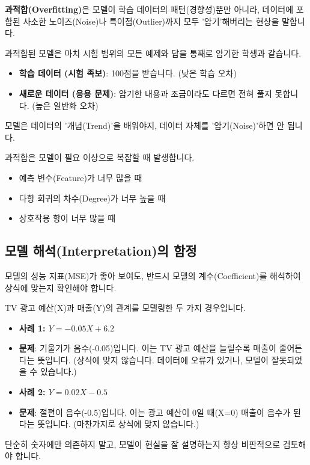 \documentclass[11pt,a4paper]{book}
\theoremstyle{definition}
\begin{document}
\textbf{과적합(Overfitting)}은 모델이 학습 데이터의 패턴(경향성)뿐만 아니라, 데이터에 포함된 사소한 노이즈(Noise)나 특이점(Outlier)까지 모두 '암기'해버리는 현상을 말합니다.

\begin{examplebox}[title=과적합 비유: 암기만 잘하는 학생]
과적합된 모델은 마치 시험 범위의 모든 예제와 답을 통째로 암기한 학생과 같습니다.
\begin{itemize}
    \item \textbf{학습 데이터 (시험 족보)}: 100점을 받습니다. (낮은 학습 오차)
    \item \textbf{새로운 데이터 (응용 문제)}: 암기한 내용과 조금이라도 다르면 전혀 풀지 못합니다. (높은 일반화 오차)
\end{itemize}
모델은 데이터의 '개념(Trend)'을 배워야지, 데이터 자체를 '암기(Noise)'하면 안 됩니다.
\end{examplebox}

과적합은 모델이 필요 이상으로 복잡할 때 발생합니다.
\begin{itemize}
    \item 예측 변수(Feature)가 너무 많을 때
    \item 다항 회귀의 차수(Degree)가 너무 높을 때
    \item 상호작용 항이 너무 많을 때
\end{itemize}

\subsection{모델 해석(Interpretation)의 함정}

모델의 성능 지표(MSE)가 좋아 보여도, 반드시 모델의 계수(Coefficient)를 해석하여 상식에 맞는지 확인해야 합니다.

\begin{examplebox}[title=모델 해석의 중요성: TV 광고 예산]
TV 광고 예산(X)과 매출(Y)의 관계를 모델링한 두 가지 경우입니다.

\begin{itemize}
    \item \textbf{사례 1: $Y = -0.05 X + 6.2$}
        \item \textbf{문제}: 기울기가 음수(-0.05)입니다. 이는 TV 광고 예산을 늘릴수록 매출이 줄어든다는 뜻입니다. (상식에 맞지 않습니다. 데이터에 오류가 있거나, 모델이 잘못되었을 수 있습니다.)
    \item \textbf{사례 2: $Y = 0.02 X - 0.5$}
        \item \textbf{문제}: 절편이 음수(-0.5)입니다. 이는 광고 예산이 0일 때(X=0) 매출이 음수가 된다는 뜻입니다. (마찬가지로 상식에 맞지 않습니다.)
\end{itemize}
단순히 숫자에만 의존하지 말고, 모델이 현실을 잘 설명하는지 항상 비판적으로 검토해야 합니다.
\end{examplebox}
\end{document}
